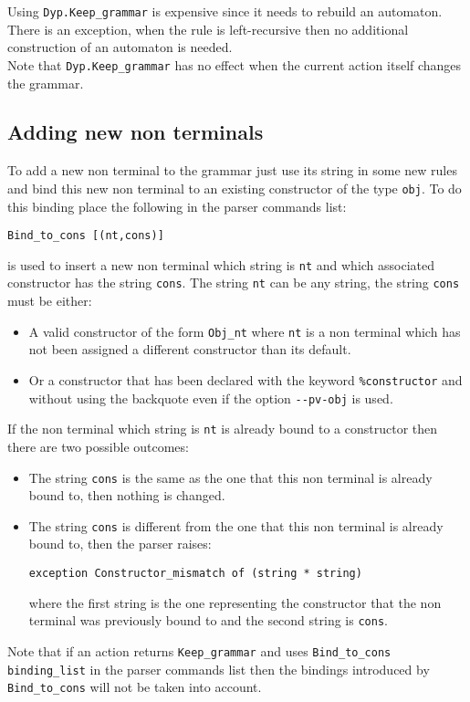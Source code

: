 \documentclass[12pt]{article}
\begin{document}
{Using \verb|Dyp.Keep_grammar| is expensive since it needs to rebuild an automaton. There is an exception, when the rule is left-recursive then no additional construction of an automaton is needed.\\

Note that \verb|Dyp.Keep_grammar| has no effect when the current action itself changes the grammar.\\

\subsection{Adding new non terminals}\label{new nt}

To add a new non terminal to the grammar just use its string in some new rules and bind this new non terminal to an existing constructor of the type \verb|obj|. To do this binding place the following in the parser commands list:
\begin{verbatim}
Bind_to_cons [(nt,cons)]
\end{verbatim}
is used to insert a new non terminal which string is \verb|nt| and which associated constructor has the string \verb|cons|. The string \verb|nt| can be any string, the string \verb|cons| must be either:
\begin{itemize}
\item A valid constructor of the form \verb|Obj_nt| where \verb|nt| is a non terminal which has not been assigned a different constructor than its default.
\item Or a constructor that has been declared with the keyword \verb|%constructor| and without using the backquote even if the option \verb|--pv-obj| is used.
\end{itemize}
If the non terminal which string is \verb|nt| is already bound to a constructor then there are two possible outcomes:
\begin{itemize}
\item The string \verb|cons| is the same as the one that this non terminal is already bound to, then  nothing is changed.
\item The string \verb|cons| is different from the one that this non terminal is already bound to, then the parser raises:
\begin{verbatim}
exception Constructor_mismatch of (string * string)
\end{verbatim}
where the first string is the one representing the constructor that the non terminal was previously bound to and the second string is \verb|cons|.\\
\end{itemize}
Note that if an action returns \verb|Keep_grammar| and uses \verb|Bind_to_cons binding_list| in the parser commands list then the bindings introduced by \verb|Bind_to_cons| will not be taken into account.\\

}
\end{document}
